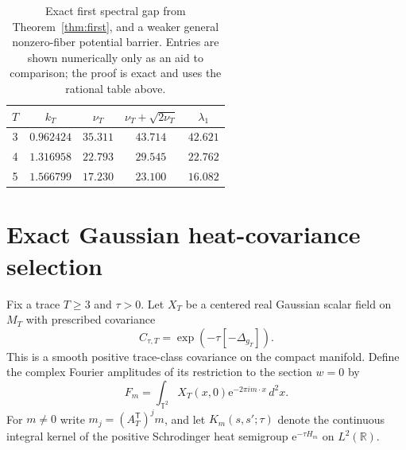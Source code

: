 \documentclass[11pt,a4paper]{article}
\newcommand{\R}{\mathbb R}
\newcommand{\T}{\mathbb T}
\newcommand{\e}{\mathrm e}
\begin{document}
\begin{table}[t]
\centering
\caption{Exact first spectral gap from Theorem~\ref{thm:first},
and a weaker general nonzero-fiber potential barrier. Entries
are shown numerically only as an aid to comparison; the proof is
exact and uses the rational table above.}
\begin{tabular}{ccccc}
\toprule
$T$ & $k_T$ & $\nu_T$ & $\nu_T+\sqrt{2\nu_T}$ & $\lambda_1$\\
\midrule
3 & $0.962424$ & $35.311$ & $43.714$ & $42.621$\\
4 & $1.316958$ & $22.793$ & $29.545$ & $22.762$\\
5 & $1.566799$ & $17.230$ & $23.100$ & $16.082$\\
\bottomrule
\end{tabular}
\label{tab:spectrum}
\end{table}

\section{Exact Gaussian heat-covariance selection}
Fix a trace $T\ge3$ and $\tau>0$. Let $X_T$ be a
centered real Gaussian scalar field on $M_T$ with prescribed
covariance
\[
C_{\tau,T}=\exp(-\tau[-\Delta_{g_T}]).
\]
This is a smooth positive trace-class covariance on the
compact manifold. Define the complex Fourier amplitudes of
its restriction to the section $w=0$ by
\[
F_m=\int_{\T^2}X_T(x,0)\e^{-2\pi i m\cdot x}\,d^2x.
\]
For $m\ne0$ write $m_j=(A_T^{\mathsf T})^j m$, and let
$K_m(s,s';\tau)$ denote the continuous integral kernel
of the positive Schrodinger heat semigroup $\e^{-\tau H_m}$
on $L^2(\R)$.
\end{document}
